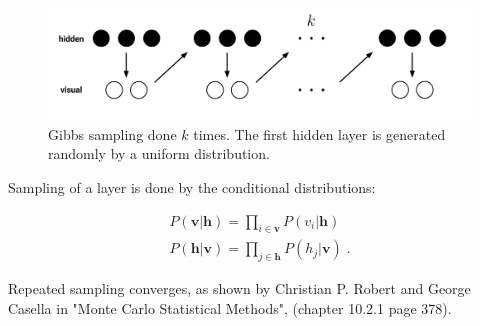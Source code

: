 \begin{figure}[H]
  \begin{center}
    \includegraphics[width=\textwidth]{Figures/Drawn/machinelearning/gibbs_sampling.pdf}
  \end{center}
  \caption{Gibbs sampling done $k$ times. The first hidden layer is generated randomly by a uniform distribution.}
\end{figure}

Sampling of a layer is done by the conditional distributions:

\begin{center}
\begin{gather}
    P(\boldsymbol{v} | \boldsymbol{h} ) = \prod_{i \in \boldsymbol{v}} P(v_i | \boldsymbol{h} ) \\ 
    P(\boldsymbol{h} | \boldsymbol{v} ) = \prod_{j \in \boldsymbol{h}} P(h_j | \boldsymbol{v} ) \; .
\end{gather}
\end{center}
Repeated sampling converges, as shown by Christian P. Robert and George Casella in "Monte Carlo Statistical Methods", \cite{Robert1999} (chapter 10.2.1 page 378).


